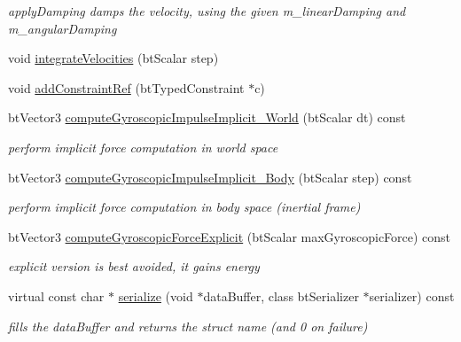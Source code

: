 \begin{CompactItemize}
\begin{CompactList}\small\item\em applyDamping damps the velocity, using the given m\_\-linearDamping and m\_\-angularDamping \item\end{CompactList}\item 
void \hyperlink{classbt_rigid_body_16029bc5aabcbb33aaf7e6e6e819283a}{integrateVelocities} (btScalar step)
\item 
void \hyperlink{classbt_rigid_body_1c89df31d2a10f06cc81da0e4b573297}{addConstraintRef} (btTypedConstraint $\ast$c)
\item 
\hypertarget{classbt_rigid_body_23d5467c62d5647a6a75eb5f60182786}{
btVector3 \hyperlink{classbt_rigid_body_23d5467c62d5647a6a75eb5f60182786}{computeGyroscopicImpulseImplicit\_\-World} (btScalar dt) const }
\label{classbt_rigid_body_23d5467c62d5647a6a75eb5f60182786}

\begin{CompactList}\small\item\em perform implicit force computation in world space \item\end{CompactList}\item 
\hypertarget{classbt_rigid_body_0ec4663c4ac2a614fa03cf93d4d533d6}{
btVector3 \hyperlink{classbt_rigid_body_0ec4663c4ac2a614fa03cf93d4d533d6}{computeGyroscopicImpulseImplicit\_\-Body} (btScalar step) const }
\label{classbt_rigid_body_0ec4663c4ac2a614fa03cf93d4d533d6}

\begin{CompactList}\small\item\em perform implicit force computation in body space (inertial frame) \item\end{CompactList}\item 
\hypertarget{classbt_rigid_body_3beda468b8cc2953b8aad44c96426cd5}{
btVector3 \hyperlink{classbt_rigid_body_3beda468b8cc2953b8aad44c96426cd5}{computeGyroscopicForceExplicit} (btScalar maxGyroscopicForce) const }
\label{classbt_rigid_body_3beda468b8cc2953b8aad44c96426cd5}

\begin{CompactList}\small\item\em explicit version is best avoided, it gains energy \item\end{CompactList}\item 
\hypertarget{classbt_rigid_body_9b1b5b688a59958aabcdf1fbc359182d}{
virtual const char $\ast$ \hyperlink{classbt_rigid_body_9b1b5b688a59958aabcdf1fbc359182d}{serialize} (void $\ast$dataBuffer, class btSerializer $\ast$serializer) const }
\label{classbt_rigid_body_9b1b5b688a59958aabcdf1fbc359182d}

\begin{CompactList}\small\item\em fills the dataBuffer and returns the struct name (and 0 on failure) \item\end{CompactList}\end{CompactItemize}
